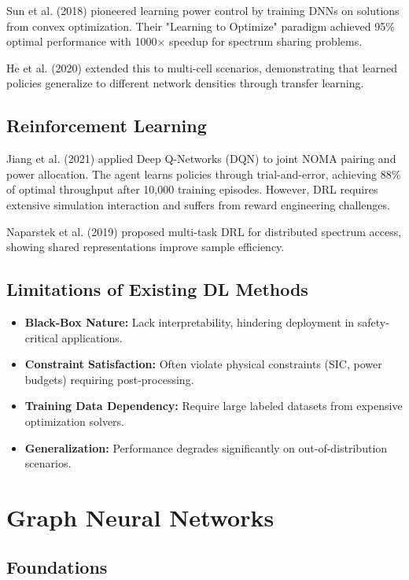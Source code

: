 Sun et al. (2018) \cite{sun2018learning} pioneered learning power control by training DNNs on solutions from convex optimization. Their "Learning to Optimize" paradigm achieved 95\% optimal performance with 1000× speedup for spectrum sharing problems.

He et al. (2020) \cite{he2020learning} extended this to multi-cell scenarios, demonstrating that learned policies generalize to different network densities through transfer learning.

\subsection{Reinforcement Learning}

Jiang et al. (2021) \cite{jiang2021joint} applied Deep Q-Networks (DQN) to joint NOMA pairing and power allocation. The agent learns policies through trial-and-error, achieving 88\% of optimal throughput after 10,000 training episodes. However, DRL requires extensive simulation interaction and suffers from reward engineering challenges.

Naparstek et al. (2019) \cite{naparstek2019deep} proposed multi-task DRL for distributed spectrum access, showing shared representations improve sample efficiency.

\subsection{Limitations of Existing DL Methods}

\begin{itemize}
    \item \textbf{Black-Box Nature:} Lack interpretability, hindering deployment in safety-critical applications.
    \item \textbf{Constraint Satisfaction:} Often violate physical constraints (SIC, power budgets) requiring post-processing.
    \item \textbf{Training Data Dependency:} Require large labeled datasets from expensive optimization solvers.
    \item \textbf{Generalization:} Performance degrades significantly on out-of-distribution scenarios.
\end{itemize}

\section{Graph Neural Networks}

\subsection{Foundations}

